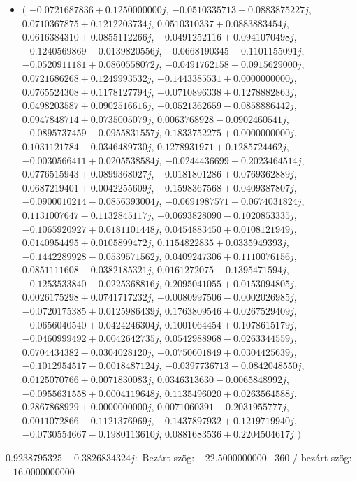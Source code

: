 \documentclass[14pt,a4paper]{article}
\begin{document}
\begin{itemize}
\item
$\big($
$-0.0721687836+0.1250000000j$, $-0.0510335713+0.0883875227j$, $0.0710367875+0.1212203734j$, $0.0510310337+0.0883883454j$, $0.0616384310+0.0855112266j$, $-0.0491252116+0.0941070498j$, $-0.1240569869-0.0139820556j$, $-0.0668190345+0.1101155091j$, $-0.0520911181+0.0860558072j$, $-0.0491762158+0.0915629000j$, $0.0721686268+0.1249993532j$, $-0.1443385531+0.0000000000j$, $0.0765524308+0.1178127794j$, $-0.0710896338+0.1278882863j$, $0.0498203587+0.0902516616j$, $-0.0521362659-0.0858886442j$, $0.0947848714+0.0735005079j$, $0.0063768928-0.0902460541j$, $-0.0895737459-0.0955831557j$, $0.1833752275+0.0000000000j$, $0.1031121784-0.0346489730j$, $0.1278931971+0.1285724462j$, $-0.0030566411+0.0205538584j$, $-0.0244436699+0.2023464514j$, $0.0776515943+0.0899368027j$, $-0.0181801286+0.0769362889j$, $0.0687219401+0.0042255609j$, $-0.1598367568+0.0409387807j$, $-0.0900010214-0.0856393004j$, $-0.0691987571+0.0674031824j$, $0.1131007647-0.1132845117j$, $-0.0693828090-0.1020853335j$, $-0.1065920927+0.0181101448j$, $0.0454883450+0.0108121949j$, $0.0140954495+0.0105899472j$, $0.1154822835+0.0335949393j$, $-0.1442289928-0.0539571562j$, $0.0409247306+0.1110076156j$, $0.0851111608-0.0382185321j$, $0.0161272075-0.1395471594j$, $-0.1253533840-0.0225368816j$, $0.2095041055+0.0153094805j$, $0.0026175298+0.0741717232j$, $-0.0080997506-0.0002026985j$, $-0.0720175385+0.0125986439j$, $0.1763809546+0.0267529409j$, $-0.0656040540+0.0424246304j$, $0.1001064454+0.1078615179j$, $-0.0460999492+0.0042642735j$, $0.0542988968-0.0263344559j$, $0.0704434382-0.0304028120j$, $-0.0750601849+0.0304425639j$, $-0.1012954517-0.0018487124j$, $-0.0397736713-0.0842048550j$, $0.0125070766+0.0071830083j$, $0.0346313630-0.0065848992j$, $-0.0955631558+0.0004119648j$, $0.1135496020+0.0263564588j$, $0.2867868929+0.0000000000j$, $0.0071060391-0.2031955777j$, $0.0011072866-0.1121376969j$, $-0.1437897932+0.1219719940j$, $-0.0730554667-0.1980113610j$, $0.0881683536+0.2204504617j$
$\big)$
\end{itemize}
$0.9238795325-0.3826834324j$:\
Bezárt szög: $-22.5000000000$ \
360 / bezárt szög: $-16.0000000000$\
\end{document}
